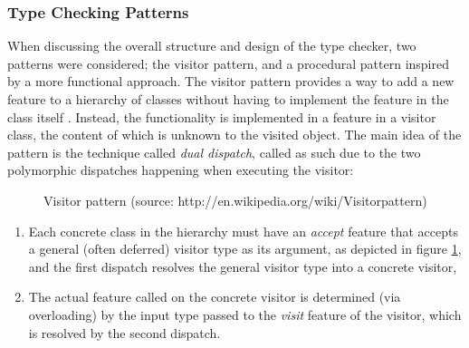 \subsubsection{Type Checking Patterns}
\label{design-tc-patterns}
When discussing the overall structure and design of the type checker, two patterns were considered; the visitor pattern, and a procedural pattern inspired by a more functional approach.
The visitor pattern provides a way to add a new feature to a hierarchy of classes without having to implement the feature in the class itself \cite{martin2002}. Instead, the functionality is implemented in a feature in a visitor class, the content of which is unknown to the visited object. The main idea of the pattern is the technique called \textit{dual dispatch}, called as such due to the two polymorphic dispatches happening when executing the visitor: 
\begin{figure}[H]
\centerline{}
    \caption[Visitor pattern]{Visitor pattern (source: http://en.wikipedia.org/wiki/Visitor\textunderscore pattern)}
    \label{fig:visitor-pattern}
\end{figure}
\begin{enumerate}
\item Each concrete class in the hierarchy must have an \textit{accept} feature that accepts a general (often deferred) visitor type as its argument, as depicted in figure \ref{fig:visitor-pattern}, and the first dispatch resolves the general visitor type into a concrete visitor,
\item The actual feature called on the concrete visitor is determined (via overloading) by the input type passed to the \textit{visit} feature of the visitor, which is resolved by the second dispatch.  
\end{enumerate}
